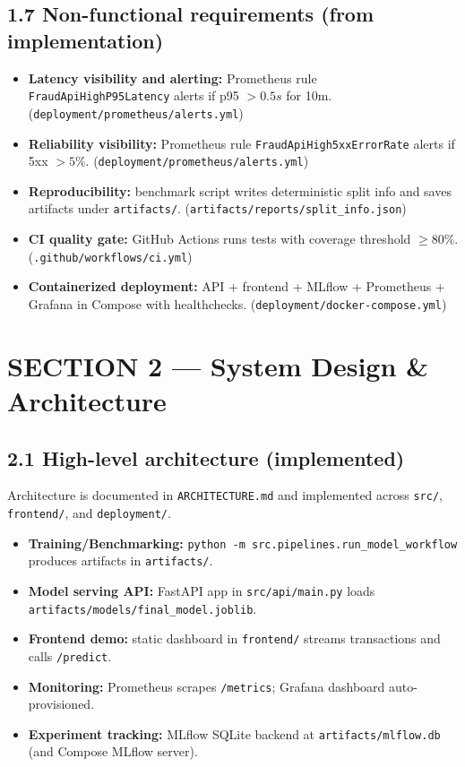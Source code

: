 \documentclass[11pt]{article}
\newcommand{\code}[1]{\texttt{#1}}
\begin{document}
\subsection*{1.7 Non-functional requirements (from implementation)}
\begin{itemize}
  \item \textbf{Latency visibility and alerting:} Prometheus rule \code{FraudApiHighP95Latency} alerts if p95 \(> 0.5s\) for 10m. (\code{deployment/prometheus/alerts.yml})
  \item \textbf{Reliability visibility:} Prometheus rule \code{FraudApiHigh5xxErrorRate} alerts if 5xx \(> 5\%\). (\code{deployment/prometheus/alerts.yml})
  \item \textbf{Reproducibility:} benchmark script writes deterministic split info and saves artifacts under \code{artifacts/}. (\code{artifacts/reports/split\_info.json})
  \item \textbf{CI quality gate:} GitHub Actions runs tests with coverage threshold \(\ge 80\%\). (\code{.github/workflows/ci.yml})
  \item \textbf{Containerized deployment:} API + frontend + MLflow + Prometheus + Grafana in Compose with healthchecks. (\code{deployment/docker-compose.yml})
\end{itemize}

\section*{SECTION 2 — System Design \& Architecture}

\subsection*{2.1 High-level architecture (implemented)}
Architecture is documented in \code{ARCHITECTURE.md} and implemented across \code{src/}, \code{frontend/}, and \code{deployment/}.

\begin{itemize}
  \item \textbf{Training/Benchmarking:} \code{python -m src.pipelines.run\_model\_workflow} produces artifacts in \code{artifacts/}.
  \item \textbf{Model serving API:} FastAPI app in \code{src/api/main.py} loads \code{artifacts/models/final\_model.joblib}.
  \item \textbf{Frontend demo:} static dashboard in \code{frontend/} streams transactions and calls \code{/predict}.
  \item \textbf{Monitoring:} Prometheus scrapes \code{/metrics}; Grafana dashboard auto-provisioned.
  \item \textbf{Experiment tracking:} MLflow SQLite backend at \code{artifacts/mlflow.db} (and Compose MLflow server).
\end{itemize}
\end{document}
